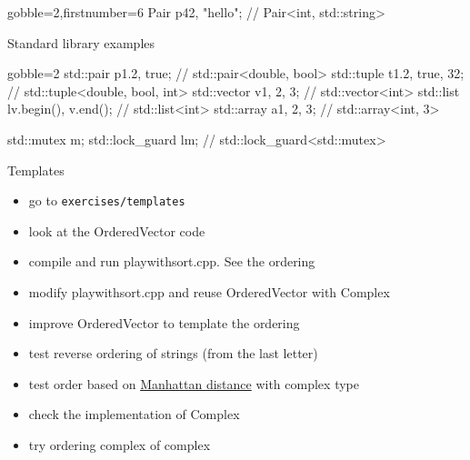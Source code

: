 \begin{advanced}
\begin{frame}[fragile]
\begin{overprint}[\columnwidth]
\begin{cppcode*}{gobble=2,firstnumber=6}
      Pair p{42, "hello"}; // Pair<int, std::string>
    \end{cppcode*}
  \end{overprint}
\end{frame}

\begin{frame}[fragile]
  \begin{block}{Standard library examples}
    \begin{cppcode*}{gobble=2}
      std::pair p{1.2, true}; // std::pair<double, bool>
      std::tuple t{1.2, true, 32};
                        // std::tuple<double, bool, int>
      std::vector v{1, 2, 3}; // std::vector<int>
      std::list l{v.begin(), v.end()}; // std::list<int>
      std::array a{1, 2, 3}; // std::array<int, 3>

      std::mutex m;
      std::lock_guard l{m}; // std::lock_guard<std::mutex>
    \end{cppcode*}
  \end{block}
\end{frame}

\end{advanced}

\begin{frame}[fragile]
  \begin{exercise}{Templates}
    \begin{itemize}
    \item go to \texttt{exercises/templates}
    \item look at the OrderedVector code
    \item compile and run playwithsort.cpp. See the ordering
    \item modify playwithsort.cpp and reuse OrderedVector with Complex
    \item improve OrderedVector to template the ordering
    \item test reverse ordering of strings (from the last letter)
    \item test order based on {\color{blue} \href{https://en.wikipedia.org/wiki/Taxicab_geometry}{Manhattan distance}} with complex type
    \item check the implementation of Complex
    \item try ordering complex of complex
    \end{itemize}
  \end{exercise}
\end{frame}
